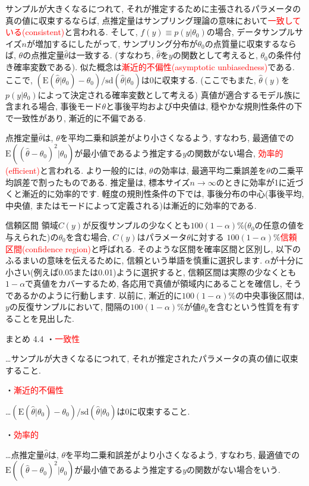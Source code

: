 \documentclass[10pt,dvipdfmx,a4]{beamer}
\newcommand{\tcr}[1]{\textcolor{red}{#1}}
\begin{document}
\begin{frame}
サンプルが大きくなるにつれて, それが推定するために主張されるパラメータの真の値に収束するならば, 点推定量はサンプリング理論の意味において\tcr{一致している(consistent)}と言われる.
そして, $f(y)\equiv p(y|\theta_0)$の場合, データサンプルサイズ$n$が増加するにしたがって, サンプリング分布が$\theta_0$の点質量に収束するならば, $\theta$の点推定量$\hat{\theta}$は一致する.
(すなわち, $\hat{\theta}$を$y$の関数として考えると, $\theta_0$の条件付き確率変数である).
似た概念は\tcr{漸近的不偏性(asymptotic unbiasedness)}である.
ここで, $(\text{E}(\hat{\theta}|\theta_0)-\theta_0)/\text{sd}(\hat{\theta}|\theta_0)$は0に収束する.
(ここでもまた, $\hat{\theta}(y)$を$p(y|\theta_0)$によって決定される確率変数として考える)
真値が適合するモデル族に含まれる場合, 事後モード$\theta$と事後平均および中央値は, 穏やかな規則性条件の下で一致性があり, 漸近的に不偏である.

点推定量$\hat{\theta}$は, $\theta$を平均二乗和誤差がより小さくなるよう, すなわち, 最適値での$\text{E}((\hat{\theta}-\theta_0)^2|\theta_0)$が最小値であるよう推定する$y$の関数がない場合, \tcr{効率的(efficient)}と言われる.
より一般的には, $\theta$の効率は, 最適平均二乗誤差を$\theta$の二乗平均誤差で割ったものである.
推定量は, 標本サイズ$n\rightarrow \infty$のときに効率が1に近づくと漸近的に効率的です.
軽度の規則性条件の下では, 事後分布の中心(事後平均, 中央値, またはモードによって定義される)は漸近的に効率的である.
\end{frame}


\begin{frame}{信頼区間}
領域$C(y)$が反復サンプルの少なくとも$100(1-\alpha)\%$($\theta_0$の任意の値を与えられた)の$\theta_0$を含む場合, $C(y)$はパラメータ$\theta$に対する $100(1-\alpha)\%$\tcr{信頼区間(confidence region)}と呼ばれる.
そのような区間を確率区間と区別し, 以下のふるまいの意味を伝えるために, 信頼という単語を慎重に選択します.
$\alpha$が十分に小さい(例えば0.05または0.01)ように選択すると, 信頼区間は実際の少なくとも$1-\alpha$で真値をカバーするため, 各応用で真値が領域内にあることを確信し, そうであるかのように行動します.
以前に, 漸近的に$100(1- \alpha)\%$の中央事後区間は, $y$の反復サンプルにおいて, 間隔の$100(1-\alpha)\%$が値$\theta_0$を含むという性質を有することを見出した.
\end{frame}


\begin{frame}{まとめ 4.4}
・\tcr{一致性}

…サンプルが大きくなるにつれて, それが推定されたパラメータの真の値に収束すること.

・\tcr{漸近的不偏性}

…$(\text{E}(\hat{\theta}|\theta_0)-\theta_0)/\text{sd}(\hat{\theta}|\theta_0)$は0に収束すること.

・\tcr{効率的}

…点推定量$\hat{\theta}$は, $\theta$を平均二乗和誤差がより小さくなるよう, すなわち, 最適値での$\text{E}((\hat{\theta}-\theta_0)^2|\theta_0)$が最小値であるよう推定する$y$の関数がない場合をいう.
\end{frame}
\end{document}
